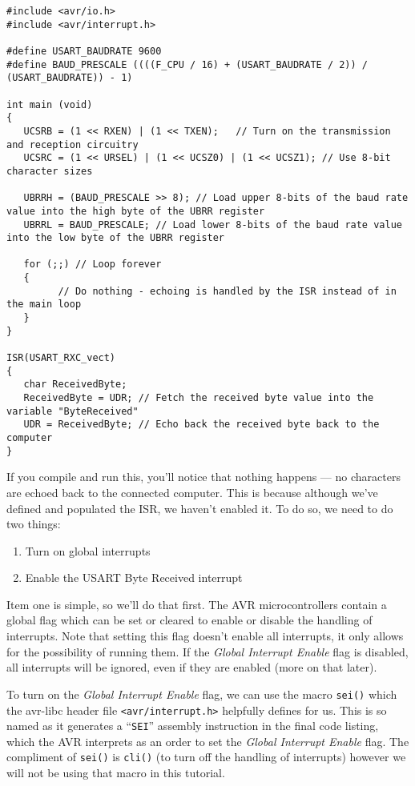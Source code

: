 \documentclass[a4paper,oneside,notitlepage]{book}
\begin{document}
\begin{center}
\begin{lstlisting}
#include <avr/io.h>
#include <avr/interrupt.h>

#define USART_BAUDRATE 9600
#define BAUD_PRESCALE ((((F_CPU / 16) + (USART_BAUDRATE / 2)) / (USART_BAUDRATE)) - 1)

int main (void)
{
   UCSRB = (1 << RXEN) | (1 << TXEN);   // Turn on the transmission and reception circuitry
   UCSRC = (1 << URSEL) | (1 << UCSZ0) | (1 << UCSZ1); // Use 8-bit character sizes

   UBRRH = (BAUD_PRESCALE >> 8); // Load upper 8-bits of the baud rate value into the high byte of the UBRR register
   UBRRL = BAUD_PRESCALE; // Load lower 8-bits of the baud rate value into the low byte of the UBRR register

   for (;;) // Loop forever
   {
         // Do nothing - echoing is handled by the ISR instead of in the main loop
   }
}

ISR(USART_RXC_vect)
{
   char ReceivedByte;
   ReceivedByte = UDR; // Fetch the received byte value into the variable "ByteReceived"
   UDR = ReceivedByte; // Echo back the received byte back to the computer
}
\end{lstlisting}
\end{center}

If you compile and run this, you'll notice that nothing happens --- no characters are echoed back to the connected computer. This is because although we've defined and populated the ISR, we haven't enabled it. To do so, we need to do two things:

\begin{enumerate}
	\item Turn on global interrupts
    \item Enable the USART Byte Received interrupt
\end{enumerate}

Item one is simple, so we'll do that first. The AVR microcontrollers contain a global flag which can be set or cleared to enable or disable the handling of interrupts. Note that setting this flag doesn't enable all interrupts, it only allows for the possibility of running them. If the \emph{Global Interrupt Enable} flag is disabled, all interrupts will be ignored, even if they are enabled (more on that later).

To turn on the \emph{Global Interrupt Enable} flag, we can use the macro \texttt{sei()} which the avr-libc header file \texttt{<avr/interrupt.h>} helpfully defines for us. This is so named as it generates a ``\texttt{SEI}'' assembly instruction in the final code listing, which the AVR interprets as an order to set the \emph{Global Interrupt Enable} flag. The compliment of \texttt{sei()} is \texttt{cli()} (to turn off the handling of interrupts) however we will not be using that macro in this tutorial.
\end{document}
